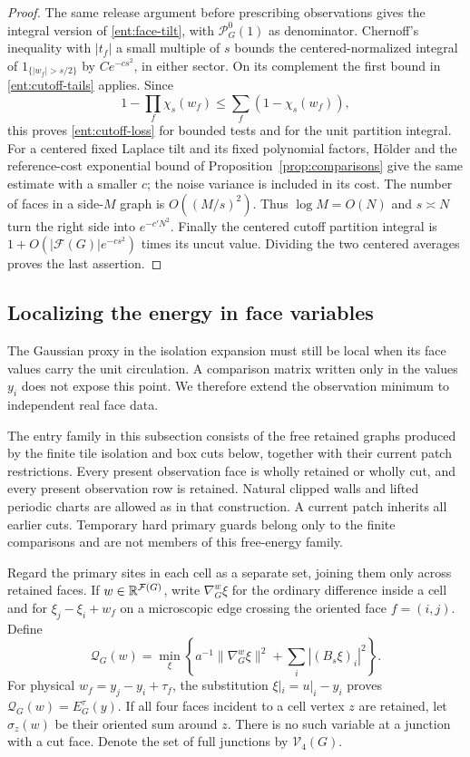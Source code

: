 \begin{proof}
The same release argument before prescribing observations gives
the integral version of \eqref{ent:face-tilt}, with
\(\mathcal P_G^0(1)\) as denominator.  Chernoff's inequality with
\(|t_f|\) a small multiple of \(s\) bounds the centered-normalized
integral of \(1_{\{|w_f|>s/2\}}\) by \(Ce^{-cs^2}\), in either
sector.  On its complement the first bound in
\eqref{ent:cutoff-tails} applies.  Since
\[
             1-\prod_f\chi_s(w_f)\le\sum_f(1-\chi_s(w_f)),
\]
this proves \eqref{ent:cutoff-loss} for bounded tests and for the
unit partition integral.  For a centered fixed Laplace tilt and its
fixed polynomial factors,
H\"older and the reference-cost exponential bound of
Proposition~\ref{prop:comparisons} give the same estimate with a
smaller \(c\); the noise variance is included in its cost.
The number of faces in a side-\(M\) graph is \(O((M/s)^2)\).
Thus \(\log M=O(N)\) and \(s\asymp N\) turn the right side into
\(e^{-c'N^2}\).  Finally the centered cutoff partition integral
is \(1+O(|\mathcal F(G)|e^{-cs^2})\) times its uncut value.
Dividing the two centered averages proves the last assertion.
\end{proof}

\subsection{Localizing the energy in face variables}

The Gaussian proxy in the isolation expansion must still be local
when its face values carry the unit circulation.  A comparison
matrix written only in the values \(y_i\) does not expose this point.
We therefore extend the observation minimum to independent real
face data.

The entry family in this subsection consists of the free retained
graphs produced by the finite tile isolation and box cuts below,
together with their current patch restrictions.  Every present
observation face is wholly retained or wholly cut, and every present
observation row is retained.  Natural clipped walls and lifted
periodic charts are allowed as in that construction.  A current
patch inherits all earlier cuts.  Temporary hard primary guards
belong only to the finite comparisons and are not members of this
free-energy family.

Regard the primary sites in each cell as a separate set, joining
them only across retained faces.  If \(w\in\mathbb R^{\mathcal F(G)}\),
write \(\nabla_G^w\xi\) for the ordinary difference inside a cell
and for \(\xi_j-\xi_i+w_f\) on a microscopic edge crossing the
oriented face \(f=(i,j)\).  Define
\[
 \mathcal Q_G(w)=\min_\xi
 \left\{a^{-1}\|\nabla_G^w\xi\|^2+\sum_i|(B_s\xi)_i|^2\right\}.
\]
For physical \(w_f=y_j-y_i+\tau_f\), the substitution
\(\xi|_i=u|_i-y_i\) proves
\(\mathcal Q_G(w)=E_G^\tau(y)\).  If all four faces incident to a
cell vertex \(z\) are retained, let
\(\sigma_z(w)\) be their oriented sum around \(z\).  There is no
such variable at a junction with a cut face.  Denote the set of
full junctions by \(\mathcal V_4(G)\).

